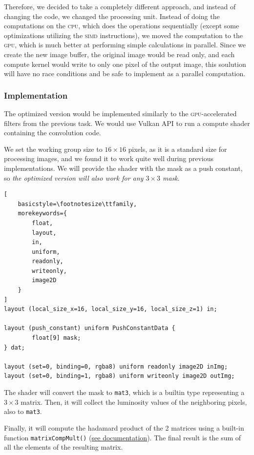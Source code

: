 \documentclass[12pt]{article}
\begin{document}
Therefore, we decided to take a completely different approach, and instead of changing the code, we changed the processing unit.
Instead of doing the computations on the \textsc{cpu}, which does the operations sequentially (except some optimizations utilizing the \textsc{simd} instructions),
we moved the computation to the \textsc{gpu}, which is much better at performing simple calculations in parallel.
Since we create the new image buffer, the original image would be read only, and each compute kernel would write to only one pixel of the output image,
this soulution will have no race conditions and be safe to implement as a parallel computation.

\subsubsection{Implementation}
The optimized version would be implemented similarly to the \textsc{gpu}-accelerated filters from the previous task.
We would use Vulkan API to run a compute shader containing the convolution code.

We set the working group size to $16\times16$ pixels, as it is a standard size for processing images,
and we found it to work quite well during previous implementations.
We will provide the shader with the mask as a push constant, so \emph{the optimized version will also work for any $3\times3$ mask}.

\begin{lstlisting}[
    basicstyle=\footnotesize\ttfamily,
    morekeywords={
        float,
        layout,
        in,
        uniform,
        readonly,
        writeonly,
        image2D
    }
]
layout (local_size_x=16, local_size_y=16, local_size_z=1) in;

layout (push_constant) uniform PushConstantData {
        float[9] mask;
} dat;

layout (set=0, binding=0, rgba8) uniform readonly image2D inImg;
layout (set=0, binding=1, rgba8) uniform writeonly image2D outImg;
\end{lstlisting}

The shader will convert the mask to \lstinline{mat3}, which is a builtin type representing a $3\times3$ matrix.
Then, it will collect the luminosity values of the neighboring pixels, also to \lstinline{mat3}.

Finally, it will compute the hadamard product of the 2 matrices using a built-in function \lstinline{matrixCompMult()} (\href{https://registry.khronos.org/OpenGL-Refpages/gl4/html/matrixCompMult.xhtml}{see documentation}).
The final result is the sum of all the elements of the resulting matrix.
\end{document}
